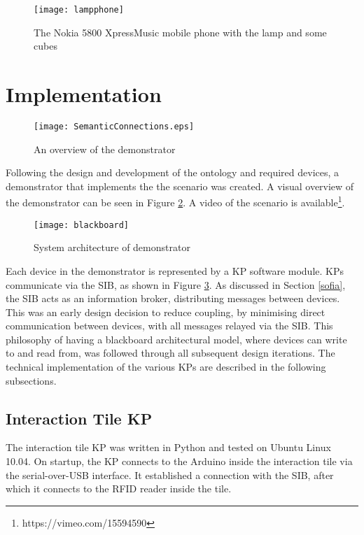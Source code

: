 \begin{figure}[bth]
\centering
\texttt{[image: lampphone]}
\caption{The Nokia 5800 XpressMusic mobile phone with the lamp and some cubes}
\label{lampphone}
\end{figure}



\section{Implementation}

\begin{figure}[bth]
\centering
\texttt{[image: SemanticConnections.eps]}
\caption{An overview of the demonstrator}
\label{semanticConnections}
\end{figure}

Following the design and development of the ontology and required devices, a demonstrator that implements the the scenario was created. A visual overview of the demonstrator can be seen in Figure \ref{semanticConnections}. A video of the scenario is available\footnote{https://vimeo.com/15594590}.

\begin{figure}[bth]
\centering
\texttt{[image: blackboard]}
\caption{System architecture of demonstrator}
\label{blackboardarch}
\end{figure}

Each device in the demonstrator is represented by a \ac{KP} software module. \acp{KP} communicate via the \ac{SIB}, as shown in Figure \ref{blackboardarch}. As discussed in Section \ref{sofia}, the \ac{SIB} acts as an information broker, distributing messages between devices. This was an early design decision to reduce coupling, by minimising direct communication between devices, with all messages relayed via the \ac{SIB}. This philosophy of having a blackboard architectural model, where devices can write to and read from, was followed through all subsequent design iterations. The technical implementation of the various \acp{KP} are described in the following subsections.


\subsection{Interaction Tile KP}

The interaction tile \ac{KP} was written in Python and tested on Ubuntu Linux 10.04. On startup, the \ac{KP} connects to the Arduino inside the interaction tile via the serial-over-USB interface. It established a connection with the \ac{SIB}, after which it connects to the \ac{RFID} reader inside the tile.

